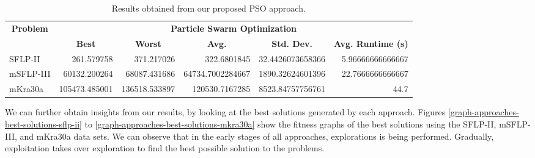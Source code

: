 \begin{table}[h!]
\begin{adjustwidth}{-1.18in}{}
\centering
\begin{tabular}{|l|r|r|r|r|r|} 
	\hline
	\multicolumn{1}{|c|}{\multirow{2}{*}{\textbf{Problem}}} & \multicolumn{5}{c|}{\textbf{Particle Swarm Optimization}}                                                                                                                                                 \\ 
	\cline{2-6}
	\multicolumn{1}{|c|}{}                                  & \multicolumn{1}{c|}{\textbf{Best}} & \multicolumn{1}{c|}{\textbf{Worst}} & \multicolumn{1}{c|}{\textbf{Avg.}} & \multicolumn{1}{c|}{\textbf{Std. Dev.}} & \multicolumn{1}{c|}{\textbf{Avg. Runtime (s)}}  \\ 
	\hline
	SFLP-II                                                 & 261.579758                         & 371.217026                          & 322.6801845                        & 32.4426073658366                        & 5.96666666666667                                \\ 
	\hline
	mSFLP-III                                               & 60132.200264                       & 68087.431686                        & 64734.7002284667                   & 1890.32624601396                        & 22.7666666666667                                \\ 
	\hline
	mKra30a                                                 & 105473.485001                      & 136518.533897                       & 120530.7167285                     & 8523.84757756761                        & 44.7                                            \\
	\hline
\end{tabular}
\end{adjustwidth}
\caption{Results obtained from our proposed PSO approach.}
\label{approach-pso-results}
\end{table}

We can further obtain insights from our results, by looking at the best solutions generated by each approach. Figures \ref{graph-approaches-best-solutions-sflp-ii} to \ref{graph-approaches-best-solutions-mkra30a} show the fitness graphs of the best solutions using the SFLP-II, mSFLP-III, and mKra30a data sets. We can observe that in the early stages of all approaches, explorations is being performed. Gradually, exploitation takes over exploration to find the best possible solution to the problems. 

